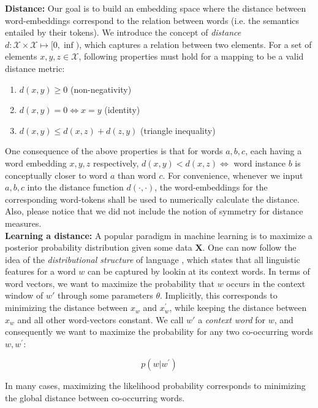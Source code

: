 \documentclass[a4paper,12pt,oneside,openright]{report}
\begin{document}
\textbf{Distance:} Our goal is to build an embedding space where the distance between word-embeddings correspond to the relation between words (i.e. the semantics entailed by their tokens).
We introduce the concept of \textit{distance} $d : \mathcal{X}  \times \mathcal{X} \mapsto [ 0, \inf )$, which captures a relation between two elements. 
For a set of elements $x, y, z \in \mathcal{X}$, following properties must hold for a mapping to be a valid distance metric:

\begin{enumerate}
\item $d(x, y) \geq 0$ (non-negativity)
\item $d(x, y) = 0 \iff x = y$ (identity)
\item $d(x, y) \leq d(x, z) + d(z, y)$ (triangle inequality)
\end{enumerate}{\label{def:distance}}

One consequence of the above properties is that for words $a, b, c$, each having a word embedding $x, y, z$ respectively, $d(x, y) < d(x, z) \iff $ word instance $b$ is conceptually closer to word $a$ than word $c$.
For convenience, whenever we input $a, b, c$ into the distance function $d(\cdot, \cdot)$, the word-embeddings for the corresponding word-tokens shall be used to numerically calculate the distance.
Also, please notice that we did not include the notion of symmetry for distance measures. \\

\textbf{Learning a distance:}
A popular paradigm in machine learning is to maximize a posterior probability distribution given some data $\mathbf{X}$.
One can now follow the idea of the \textit{distributional structure} of language \cite{harris54}, which states that all linguistic features for a word $w$ can be captured by lookin at its context words.
In terms of word vectors, we want to maximize the probability that $w$ occurs in the context window of $w \prime$ through some parameters $\theta$.
Implicitly, this corresponds to minimizing the distance between $x_w$ and $x_w^{\prime}$, while keeping the distance between $x_w$ and all other word-vectors constant. 
We call $w \prime$ a \textit{context word} for $w$, and consequently we want to maximize the probability for any two co-occurring words $w, w^{\prime}$:

\begin{equation}
p \left(w | w^{\prime}\right) \nonumber
\end{equation}

In many cases, maximizing the likelihood probability corresponds to minimizing the global distance between co-occurring words.
\end{document}
